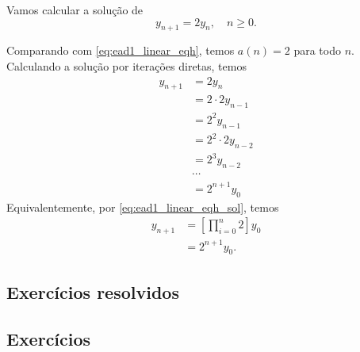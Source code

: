 \begin{ex}
  Vamos calcular a solução de
  \begin{equation}
    y_{n+1} = 2y_n,\quad n\geq 0.
  \end{equation}

  Comparando com \eqref{eq:ead1_linear_eqh}, temos $a(n) = 2$ para todo $n$. Calculando a solução por iterações diretas, temos
  \begin{align}
    y_{n+1} &= 2y_n \\
            &= 2\cdot 2y_{n-1} \\
            &= 2^2y_{n-1} \\
            &= 2^2\cdot 2y_{n-2} \\
            &= 2^3y_{n-2} \\
            &\cdots \\
            &= 2^{n+1}y_0
  \end{align}
  Equivalentemente, por \eqref{eq:ead1_linear_eqh_sol}, temos
  \begin{align}
    y_{n+1} &= \left[\prod_{i=0}^{n}2\right]y_{0} \\
            &= 2^{n+1}y_0.
  \end{align}
\end{ex}

\emconstrucao

\subsection*{Exercícios resolvidos}

\emconstrucao

\subsection*{Exercícios}

\emconstrucao